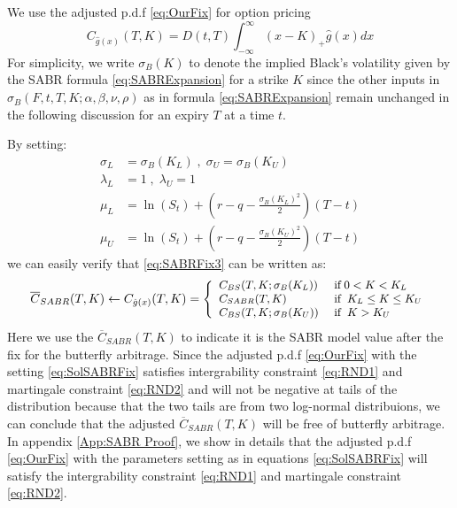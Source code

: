 \documentclass[letterpaper,12pt,titlepage,oneside,final]{book}
\numberwithin{equation}{section}
\theoremstyle{definition}
\begin{document}
We use the adjusted p.d.f \eqref{eq:OurFix} for option pricing
\begin{equation}
C_{\hat{g}(x)}(T,K)=D(t,T)\int_{-\infty}^{\infty} (x-K)_+ \hat{g}(x) dx
\label{eq:SABRFix3}
\end{equation}
For simplicity, we write $\sigma_{B}(K)$ to denote the implied Black's volatility given by the SABR formula \eqref{eq:SABRExpansion} for a strike $K$ since the other inputs in  $\sigma_{B}(F,t,T,K;\alpha,\beta,\nu,\rho)$  as in formula \eqref{eq:SABRExpansion} remain unchanged in the following discussion for an expiry $T$ at a time $t$.


By setting: 
\begin{equation}
\begin{split}
\sigma_{L}&=\sigma_{B}(K_L)\;,\;\sigma_{U}=\sigma_{B}(K_U)\\
\lambda_{L}&=1 \;,\;\lambda_{U}=1\\
\mu_L&=\ln(S_t)+(r-q-\frac{\sigma_{B}(K_L)^2}{2})(T-t)\\ 
\mu_U&=\ln(S_t)+(r-q-\frac{\sigma_{B}(K_U)^2}{2})(T-t)
\end{split}
\label{eq:SolSABRFix}
\end{equation}
we can easily verify that \eqref{eq:SABRFix3} can be written as:
\[\small
\overline{C}_{SABR}(T,K) \leftarrow C_{\hat{g}(x)}(T,K)=\left\{ \begin{array}{ll }
C_{BS}(T,K;\sigma_{B}(K_L))\;&  \text{if} \; 0<K< K_{L}\\

C_{SABR}(T,K)\;&  \text{if} \; \;  K_{L} \leq K \leq K_{U}\\

C_{BS}(T,K;\sigma_{B}(K_U)) \; &  \text{if} \; \;  K> K_{U}
\end{array} \right.
\]
Here we use the $\overline{C}_{SABR}(T,K)$ to indicate it is the SABR model value after the  fix for the butterfly arbitrage.  Since the adjusted p.d.f \eqref{eq:OurFix} with the setting \eqref{eq:SolSABRFix} satisfies intergrability constraint \eqref{eq:RND1} and martingale  constraint \eqref{eq:RND2} and will not be negative at tails of the distribution because that the two tails are from two log-normal distribuions, we can conclude that the adjusted $\overline{C}_{SABR}(T,K)$ will be free of butterfly arbitrage. In appendix \ref{App:SABR Proof}, we show in details that the adjusted p.d.f \eqref{eq:OurFix} with the parameters  setting as in equations \eqref{eq:SolSABRFix} will satisfy the intergrability constraint \eqref{eq:RND1} and martingale  constraint \eqref{eq:RND2}.
\end{document}

